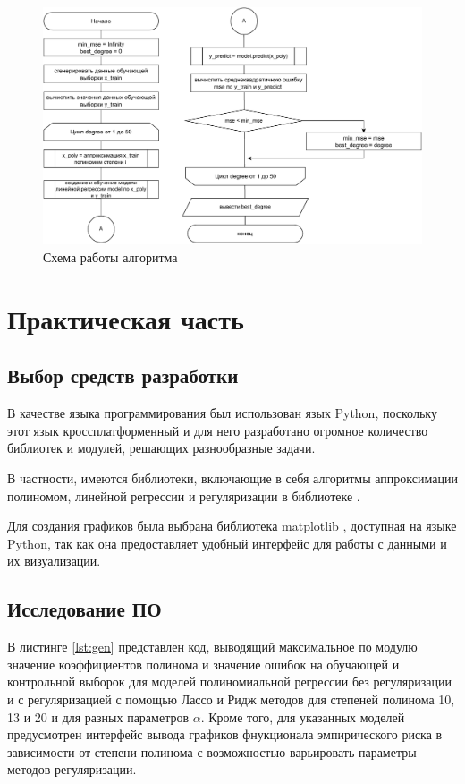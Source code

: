 \documentclass[12pt]{report}
\begin{document}
\begin{figure}[h!]
  \centering
  \includegraphics[width = \linewidth]{mml_lab_01.pdf}
  \caption{Схема работы алгоритма}
  \label{fig:algo_gen}
\end{figure}


\chapter{Практическая часть}

\section{Выбор средств разработки}
В качестве языка программирования был использован язык Python, поскольку этот язык кроссплатформенный и для него разработано огромное количество библиотек и модулей, решающих разнообразные задачи. 

В частности, имеются библиотеки, включающие в себя алгоритмы аппроксимации полиномом, линейной регрессии и регуляризации в библиотеке \cite{bib:sklearn}.

Для создания графиков была выбрана библиотека matplotlib \cite{bib:matplotlib}, доступная на языке Python, так как она предоставляет удобный интерфейс для работы с данными и их визуализации.

\section{Исследование ПО}

В листинге \ref{lst:gen} представлен код, выводящий максимальное по модулю значение коэффициентов полинома и значение ошибок на обучающей и контрольной выборок для моделей полиномиальной регрессии без регуляризации и с регуляризацией с помощью Лассо и Ридж методов для степеней полинома 10, 13 и 20 и для разных параметров $\alpha$. Кроме того, для указанных моделей предусмотрен интерфейс вывода графиков фнукционала эмпирического риска в зависимости от степени полинома с возможностью варьировать параметры методов регуляризации.
\end{document}
